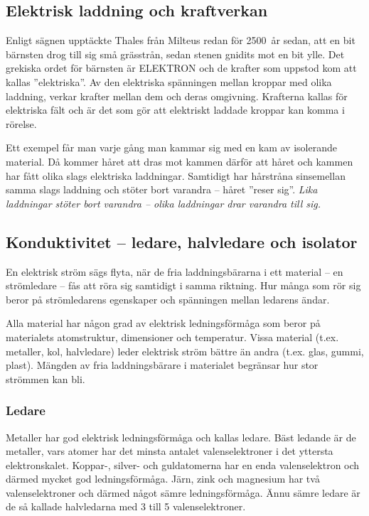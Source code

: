 \subsection{Elektrisk laddning och kraftverkan}
\frdjp
{}

Enligt sägnen upptäckte Thales från Milteus redan för 2500~år sedan, att en bit
bärnsten drog till sig små grässtrån, sedan stenen gnidits mot en bit ylle.
Det grekiska ordet för bärnsten är ELEKTRON och de krafter som uppstod kom att
kallas ''elektriska''.
Av den elektriska spänningen mellan kroppar med olika laddning, verkar krafter
mellan dem och deras omgivning.
Krafterna kallas för elektriska fält och är det som gör att elektriskt laddade
kroppar kan komma i rörelse.

Ett exempel får man varje gång man kammar sig med en kam av isolerande material.
Då kommer håret att dras mot kammen därför att håret och kammen har
fått olika slags elektriska laddningar.
Samtidigt har hårstråna sinsemellan samma slags laddning och stöter bort
varandra -- håret ''reser sig''.
\emph{Lika laddningar stöter bort varandra -- olika laddningar drar varandra till sig.}

\subsection{Konduktivitet -- ledare, halvledare och isolator}
\label{konduktivitet}

En elektrisk ström sägs flyta, när de fria laddningsbärarna i ett material -- en
strömledare -- fås att röra sig samtidigt i samma riktning.
Hur många som rör sig beror på strömledarens egenskaper och spänningen mellan
ledarens ändar.

Alla material har någon grad av elektrisk ledningsförmåga som beror på
materialets atomstruktur, dimensioner och temperatur.
Vissa material (t.ex. metaller, kol, halvledare) leder elektrisk ström bättre
än andra (t.ex. glas, gummi, plast).
Mängden av fria laddningsbärare i materialet begränsar hur stor strömmen kan
bli.

\subsubsection{Ledare}
\label{ledare}

Metaller har god elektrisk ledningsförmåga och kallas ledare.
Bäst ledande är de metaller, vars atomer har det minsta antalet
valenselektroner i det yttersta elektronskalet.
Koppar-, silver- och guldatomerna har en enda valenselektron och därmed mycket
god ledningsförmåga.
Järn, zink och magnesium har två valenselektroner och därmed något sämre
ledningsförmåga.
Ännu sämre ledare är de så kallade halvledarna med 3 till 5 valenselektroner.

